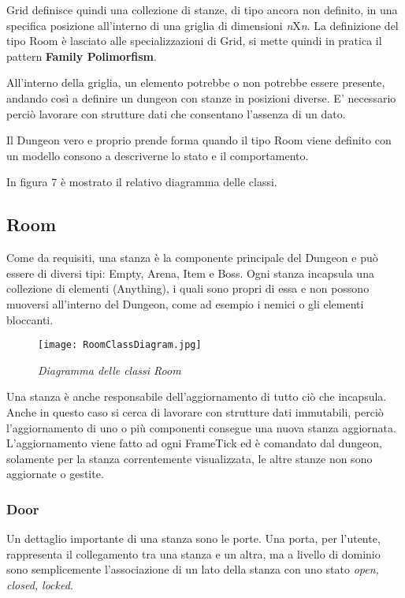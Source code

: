 Grid definisce quindi una collezione di stanze, di tipo ancora non definito, in una specifica posizione all'interno di una griglia di dimensioni \textit{n}X\textit{n}. La definizione del tipo Room è lasciato alle specializzazioni di Grid, si mette quindi in pratica il pattern \textbf{Family Polimorfism}.

All'interno della griglia, un elemento potrebbe o non potrebbe essere presente, andando così a definire un dungeon con stanze in posizioni diverse. 
E' necessario perciò lavorare con strutture dati che consentano l'assenza di un dato.

Il Dungeon vero e proprio prende forma quando il tipo Room viene definito con un modello consono a descriverne lo stato e il comportamento. 

In figura 7 è mostrato il relativo diagramma delle classi.
\subsection{Room}
Come da requisiti, una stanza è la componente principale del Dungeon e può essere di diversi tipi: Empty, Arena, Item e Boss. 
Ogni stanza incapsula una collezione di elementi (Anything), i quali sono propri di essa e non possono muoversi all'interno del Dungeon, come ad esempio i nemici o gli elementi bloccanti. 

\begin{figure}[!hbt]
    \centering
    \texttt{[image: RoomClassDiagram.jpg]}
    \caption{\textit{Diagramma delle classi Room}} 
\end{figure}

Una stanza è anche responsabile dell'aggiornamento di tutto ciò che incapsula. Anche in questo caso si cerca di lavorare con strutture dati immutabili, perciò l'aggiornamento di uno o più componenti consegue una nuova stanza aggiornata. 
L'aggiornamento viene fatto ad ogni FrameTick ed è comandato dal dungeon, solamente per la stanza correntemente visualizzata, le altre stanze non sono aggiornate o gestite.  

\subsubsection{Door}
Un dettaglio importante di una stanza sono le porte. Una porta, per l'utente, rappresenta il collegamento tra una stanza e un altra, ma a livello di dominio sono semplicemente l'associazione di un lato della stanza con uno stato \textit{open, closed, locked}. 

